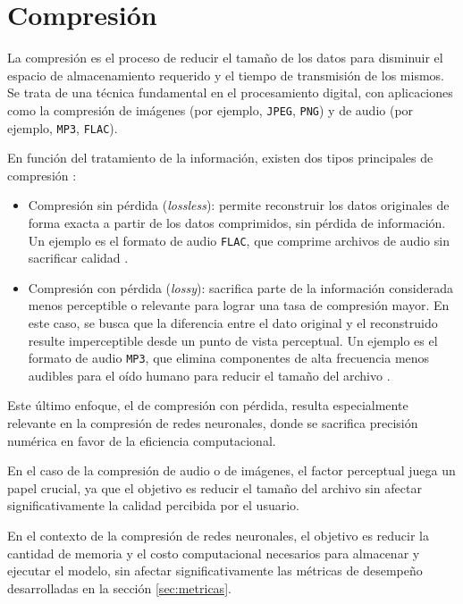 \section{Compresión}
\label{sec:compresion}

La compresión es el proceso de reducir el tamaño de los datos para disminuir el espacio de almacenamiento requerido y el tiempo de transmisión de los mismos. Se trata de una técnica fundamental en el procesamiento digital, con aplicaciones como la compresión de imágenes (por ejemplo, \texttt{JPEG}, \texttt{PNG}) y de audio (por ejemplo, \texttt{MP3}, \texttt{FLAC}).

En función del tratamiento de la información, existen dos tipos principales de compresión \cite{Kavitha2016A}:

\begin{itemize}
    \item Compresión sin pérdida (\textit{lossless}): permite reconstruir los datos originales de forma exacta a partir de los datos comprimidos, sin pérdida de información. Un ejemplo es el formato de audio \texttt{FLAC}, que comprime archivos de audio sin sacrificar calidad \cite{flac_spec}.
    \item Compresión con pérdida (\textit{lossy}): sacrifica parte de la información considerada menos perceptible o relevante para lograr una tasa de compresión mayor. En este caso, se busca que la diferencia entre el dato original y el reconstruido resulte imperceptible desde un punto de vista perceptual. Un ejemplo es el formato de audio \texttt{MP3}, que elimina componentes de alta frecuencia menos audibles para el oído humano para reducir el tamaño del archivo \cite{brandenburg1999mp3}.
\end{itemize}

Este último enfoque, el de compresión con pérdida, resulta especialmente relevante en la compresión de redes neuronales, donde se sacrifica precisión numérica en favor de la eficiencia computacional.

En el caso de la compresión de audio o de imágenes, el factor perceptual juega un papel crucial, ya que el objetivo es reducir el tamaño del archivo sin afectar significativamente la calidad percibida por el usuario.

En el contexto de la compresión de redes neuronales, el objetivo es reducir la cantidad de memoria y el costo computacional necesarios para almacenar y ejecutar el modelo, sin afectar significativamente las métricas de desempeño desarrolladas en la sección \ref{sec:metricas}.
